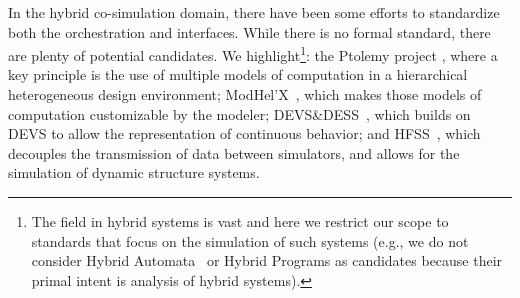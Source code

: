 In the hybrid co-simulation domain, there have been some efforts to standardize both the orchestration and interfaces. 
While there is no formal standard, there are plenty of potential candidates.
We highlight\footnote{The field in hybrid systems is vast and here we restrict our scope to standards that focus on the simulation of such systems (e.g., we do not consider Hybrid Automata~\cite{Lynch2003} or Hybrid Programs \cite{Platzer2010} as candidates because their primal intent is analysis of hybrid systems).}: the Ptolemy project \cite{Buck1994}, where a key principle is the use of multiple models of computation in a hierarchical heterogeneous design environment; ModHel'X~\cite{Boulanger2011}, which makes those models of computation customizable by the modeler; DEVS\&DESS~\cite{Zeigler2006}, which builds on DEVS to allow the representation of continuous behavior; and HFSS~\cite{Barros1997}, which decouples the transmission of data between simulators, and allows for the simulation of dynamic structure systems.










